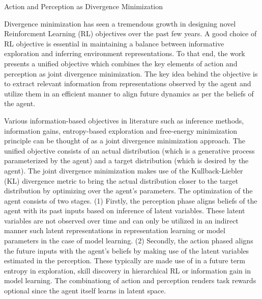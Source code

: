 \documentclass[11pt,letterpaper]{article}
\begin{document}
\begin{center}
  \large{Action and Perception as Divergence Minimization}
\end{center}


Divergence minimization has seen a tremendous growth in designing novel Reinforcment Learning (RL) objectives over the past few years. A good choice of RL objective is essential in maintaining a balance between informative exploration and inferring environment representations. To that end, the work presents a unified objective which combines the key elements of action and perception as joint divergence minimization. The key idea behind the objective is to extract relevant information from representations observed by the agent and utilize them in an efficient manner to align future dynamics as per the beliefs of the agent.

Various information-based objectives in literature such as inference methods, information gains, entropy-based exploration and free-energy minimization principle can be thought of as a joint divergence minimization approach. The unified objective consists of an actual distribution (which is a generative process parameterized by the agent) and a target distribution (which is desired by the agent). The joint divergence minimization makes use of the Kullback-Liebler (KL) divergence metric to bring the actual distribution closer to the target distribution by optimizing over the agent's parameters. The optimization of the agent consists of two stages. (1) Firstly, the perception phase aligns beliefs of the agent with its past inputs based on inference of latent variables. These latent variables are not observed over time and can only be utilized in an indirect manner such latent representations in representation learning or model parameters in the case of model learning. (2) Secondly, the action phased aligns the future inputs with the agent's beliefs by making use of the latent variables estimated in the perception. These typically are made use of in a future term entropy in exploration, skill discovery in hierarchical RL or information gain in model learning. The combinationg of action and perception renders task rewards optional since the agent itself learns in latent space.
\end{document}
